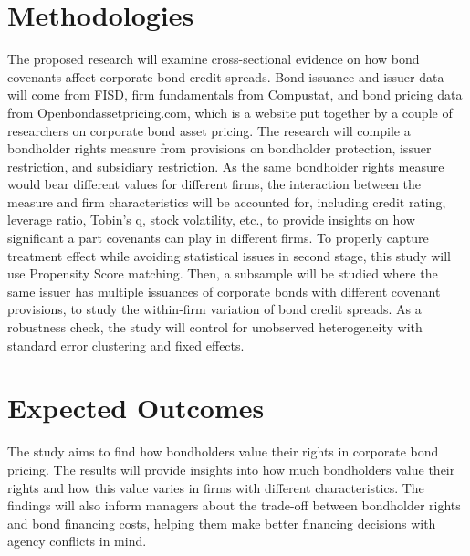 \documentclass[a4paper, 10pt, authoryear]{elsarticle}
\begin{document}
\section{Methodologies}
The proposed research will examine cross-sectional evidence on how bond covenants affect corporate bond credit spreads. Bond issuance and issuer data will come from FISD, firm fundamentals from Compustat, and bond pricing data from Openbondassetpricing.com, which is a website put together by a couple of researchers on corporate bond asset pricing. The research will compile a bondholder rights measure from provisions on bondholder protection, issuer restriction, and subsidiary restriction. As the same bondholder rights measure would bear different values for different firms, the interaction between the measure and firm characteristics will be accounted for, including credit rating, leverage ratio, Tobin's q, stock volatility, etc., to provide insights on how significant a part covenants can play in different firms. To properly capture treatment effect while avoiding statistical issues in second stage, this study will use Propensity Score matching. Then, a subsample will be studied where the same issuer has multiple issuances of corporate bonds with different covenant provisions, to study the within-firm variation of bond credit spreads. As a robustness check, the study will control for unobserved heterogeneity with standard error clustering and fixed effects.

\section{Expected Outcomes}
The study aims to find how bondholders value their rights in corporate bond pricing. The results will provide insights into how much bondholders value their rights and how this value varies in firms with different characteristics. The findings will also inform managers about the trade-off between bondholder rights and bond financing costs, helping them make better financing decisions with agency conflicts in mind.


\end{document}
